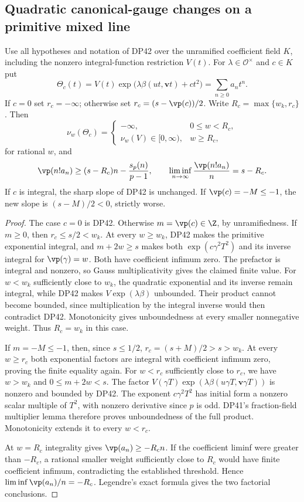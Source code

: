 \subsection{Quadratic canonical-gauge changes on a primitive mixed line}

\begin{proposition}\label{DP48}
Use all hypotheses and notation of DP42 over the unramified coefficient field $K$, including the nonzero integral-function restriction $V(t)$. For $\lambda\in\mathcal O^\times$ and $c\in K$ put
\[
 \Theta_c(t)=V(t)\exp\bigl(\lambda\beta(ut,\mathbf vt)+ct^2\bigr)
        =\sum_{n\ge0}a_nt^n.
\]
If $c=0$ set $r_c=-\infty$; otherwise set
$r_c=(s-\vp(c))/2$. Write $R_c=\max\{w_k,r_c\}$.
Then
\[
 \nu_w(\Theta_c)=
 \begin{cases}
 -\infty,&0\le w<R_c,\\
 \nu_w(V)\in[0,\infty),&w\ge R_c,
 \end{cases}
\]
for rational $w$, and
\[
 \vp(n!a_n)\ge(s-R_c)n-\frac{s_p(n)}{p-1},\qquad
 \liminf_{n\to\infty}\frac{\vp(n!a_n)}n=s-R_c.
\]
If $c$ is integral, the sharp slope of DP42 is unchanged. If
$\vp(c)=-M\le-1$, the new slope is $(s-M)/2<0$, strictly worse.
\end{proposition}

\begin{proof}
The case $c=0$ is DP42. Otherwise $m=\vp(c)\in\Z$, by unramifiedness.
If $m\ge0$, then $r_c\le s/2<w_k$.
At every $w\ge w_k$, DP42 makes the primitive exponential integral, and $m+2w\ge s$ makes both $\exp(c\gamma^2T^2)$ and its inverse integral for $\vp(\gamma)=w$. Both have coefficient infimum zero. The prefactor is integral and nonzero, so Gauss multiplicativity gives the claimed finite value.
For $w<w_k$ sufficiently close to $w_k$, the quadratic exponential and its inverse remain integral, while DP42 makes $V\exp(\lambda\beta)$ unbounded. Their product cannot become bounded, since multiplication by the integral inverse would then contradict DP42. Monotonicity gives unboundedness at every smaller nonnegative weight. Thus $R_c=w_k$ in this case.

If $m=-M\le-1$, then, since $s\le1/2$,
$r_c=(s+M)/2>s>w_k$.
At every $w\ge r_c$ both exponential factors are integral with coefficient infimum zero, proving the finite equality again.
For $w<r_c$ sufficiently close to $r_c$, we have $w>w_k$ and
$0\le m+2w<s$.
The factor $V(\gamma T)\exp(\lambda\beta(u\gamma T,\mathbf v\gamma T))$ is nonzero and bounded by DP42.
The exponent $c\gamma^2T^2$ has initial form a nonzero scalar multiple of $T^2$, with nonzero derivative since $p$ is odd.
DP41's fraction-field multiplier lemma therefore proves unboundedness of the full product. Monotonicity extends it to every $w<r_c$.

At $w=R_c$ integrality gives $\vp(a_n)\ge-R_cn$.
If the coefficient liminf were greater than $-R_c$, a rational smaller weight sufficiently close to $R_c$ would have finite coefficient infimum, contradicting the established threshold. Hence $\liminf\vp(a_n)/n=-R_c$. Legendre's exact formula gives the two factorial conclusions.
\end{proof}

